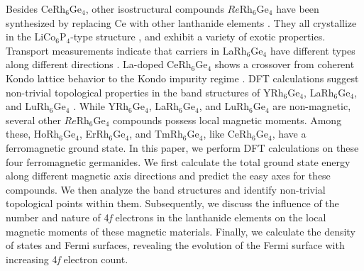 \documentclass[preprint,12pt]{elsarticle}
\begin{document}

Besides CeRh$_6$Ge$_4$, other isostructural compounds $Re$Rh$_6$Ge$_4$ have been synthesized by replacing Ce with other lanthanide elements \cite{Vosswinkel2013_Zfauac639-2623}.%
They all crystallize in the LiCo$_6$P$_4$-type structure  \cite{buschmann1991darstellung}, %
and exhibit a variety of exotic properties. Transport measurements indicate that carriers in LaRh$_6$Ge$_4$ have different types along different directions \cite{Luo2023_PRB108-195146}.%
La-doped CeRh$_6$Ge$_4$ shows a crossover from coherent Kondo lattice behavior to the Kondo impurity regime \cite{Xu2021_CPL38-087101}.%
DFT calculations suggest non-trivial topological properties in the band structures of YRh$_6$Ge$_4$, LaRh$_6$Ge$_4$, and LuRh$_6$Ge$_4$ \cite{Guo2018_PRB98-045134}.%
While YRh$_6$Ge$_4$, LaRh$_6$Ge$_4$, and LuRh$_6$Ge$_4$ are non-magnetic, several other $Re$Rh$_6$Ge$_4$ compounds possess local magnetic moments. Among these, HoRh$_6$Ge$_4$, ErRh$_6$Ge$_4$, and TmRh$_6$Ge$_4$, like CeRh$_6$Ge$_4$, have a ferromagnetic ground state. In this paper, we perform DFT calculations on these four ferromagnetic germanides. We first calculate the total ground state energy along different magnetic axis directions and predict the easy axes for these compounds. We then analyze the band structures and identify non-trivial topological points within them. Subsequently, we discuss the influence of the number and nature of 4\textit{f} electrons in the lanthanide elements on the local magnetic moments of these magnetic materials. Finally, we calculate the density of states and Fermi surfaces, revealing the evolution of the Fermi surface with increasing 4\textit{f} electron count.
       	
\end{document}
